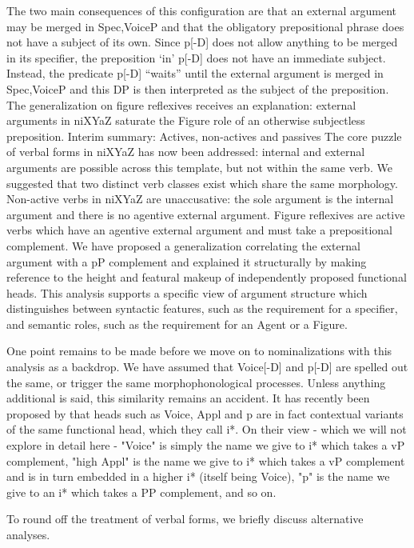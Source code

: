The two main consequences of this configuration are that an external argument may be merged in Spec,VoiceP and that the obligatory prepositional phrase does not have a subject of its own. Since p[-D] does not allow anything to be merged in its specifier, the preposition ‘in’ p[-D] does not have an immediate subject. Instead, the predicate p[-D] “waits” until the external argument is merged in Spec,VoiceP and this DP is then interpreted as the subject of the preposition. The generalization on figure reflexives receives an explanation: external arguments in niXYaZ saturate the Figure role of an otherwise subjectless preposition.
Interim summary: Actives, non-actives and passives
The core puzzle of verbal forms in niXYaZ has now been addressed: internal and external arguments are possible across this template, but not within the same verb. We suggested that two distinct verb classes exist which share the same morphology. Non-active verbs in niXYaZ are unaccusative: the sole argument is the internal argument and there is no agentive external argument. Figure reflexives are active verbs which have an agentive external argument and must take a prepositional complement. We have proposed a generalization correlating the external argument with a pP complement and explained it structurally by making reference to the height and featural makeup of independently proposed functional heads. This analysis supports a specific view of argument structure which distinguishes between syntactic features, such as the requirement for a specifier, and semantic roles, such as the requirement for an Agent or a Figure.

One point remains to be made before we move on to nominalizations with this analysis as a backdrop. We have assumed that Voice[-D] and p[-D] are spelled out the same, or trigger the same morphophonological processes. Unless anything additional is said, this similarity remains an accident. It has recently been proposed by \cite{woodmarantz17} that heads such as Voice, Appl and p are in fact contextual variants of the same functional head, which they call i*. On their view - which we will not explore in detail here - "Voice" is simply the name we give to i* which takes a vP complement, "high Appl" is the name we give to i* which takes a vP complement and is in turn embedded in a higher i* (itself being Voice), "p" is the name we give to an i* which takes a PP complement, and so on.

To round off the treatment of verbal forms, we briefly discuss alternative analyses.


